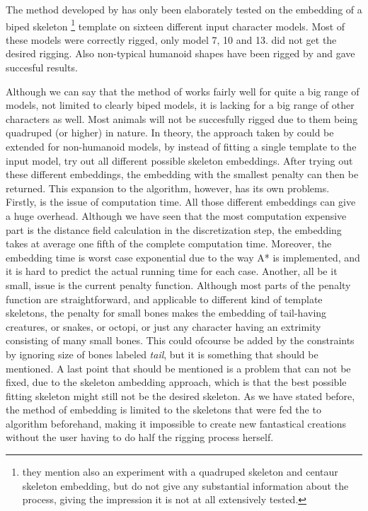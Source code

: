 \documentclass{article}
\begin{document}
The method developed by \citep{paper1} has only been elaborately tested on the
embedding of a biped skeleton \footnote{they mention also an experiment with a quadruped
skeleton and centaur skeleton embedding, but do not give any substantial information
about the process, giving the impression it is not at all extensively tested.}
template on sixteen different input character models. Most of these models were
correctly rigged, only model 7, 10 and 13. did not get the desired rigging. 
Also non-typical humanoid shapes have been rigged by \citep{paper1} and gave
succesful results.

Although we can say that the method of \citep{paper1} works fairly well for
quite a big range of models, not limited to clearly biped models, it is lacking for a big range of other characters
as well. Most animals will not be succesfully rigged due to them being quadruped
(or higher)
in nature. In theory, the approach taken by \citep{paper1} could be extended for
non-humanoid models, by instead of fitting a single template to the input model,
try out all different possible skeleton
embeddings. After trying out these different embeddings, the embedding with the
smallest penalty can then be returned. This expansion to the algorithm, however,
has its own problems. Firstly, is the issue of computation time. All those different embeddings can give a 
huge overhead. Although we have seen that the most computation expensive part is
the distance field calculation in the discretization step, the embedding takes
at average one fifth of the complete computation time. Moreover, the
embedding time is worst case exponential due to the way A* is implemented, 
and it is hard to predict the actual running time for each case.
Another, all be it small, issue is the current penalty function. Although most parts of the penalty
function are straightforward, and applicable to different kind of template
skeletons, the penalty for small bones makes the embedding of tail-having
creatures, or snakes, or octopi, or just any character having an extrimity
consisting of many small bones. This could ofcourse be added by the constraints
by ignoring size of bones labeled \emph{tail}, but it is something that should
be mentioned.
A last point that should be mentioned is a problem that can not be fixed, due to
the skeleton ambedding approach, which is that the best possible fitting
skeleton might still not be the desired skeleton. As we have stated before, the
method of embedding is limited to the skeletons that were fed the to algorithm
beforehand, making it impossible to create new fantastical creations without
the user having to do half the rigging process herself.
\end{document}
